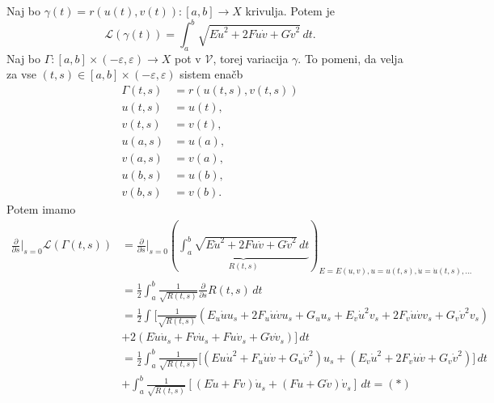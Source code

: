 Naj bo $\gamma(t) = r(u(t), v(t)): [a,b] \to X$ krivulja. Potem je \begin{equation*}
\mathcal{L}(\gamma(t)) = \int_{a}^{b} \sqrt{E\dot{u}^2 + 2F\dot{u}\dot{v} + G\dot{v}^2}  \, dt. 
\end{equation*}  
Naj bo $\Gamma : [a,b] \times  (-\varepsilon, \varepsilon) \to  X$ pot v $\mathcal{V}$, torej variacija $\gamma$. To pomeni, da velja za vse $(t,s) \in [a,b] \times  (-\varepsilon, \varepsilon)$ sistem enačb
\begin{align*}
    \Gamma(t,s) &= r(u(t,s), v(t,s)) \\
     u(t,s) &= u(t), \\
     v(t,s) &= v(t), \\
     u(a,s) &= u(a), \\
     v(a,s) &= v(a), \\
     u(b,s) &= u(b), \\
     v(b,s) &= v(b). 
\end{align*}
Potem imamo \begin{align*}
    \frac{ \partial  }{ \partial s} \bigg|_{s = 0} \mathcal{L}(\Gamma(t,s))  &= \frac{ \partial  }{ \partial s } \bigg|_{s = 0}  \left(\underbrace{\int_{a}^{b} \sqrt{E\dot{u}^2 + 2F\dot{u}\dot{v} + G\dot{v}^2}  \, dt }_{R(t,s)}\right)_{E = E(u,v), u = u(t,s), \dot{u} = \dot{u}(t,s), \ldots} \\
    &=  \frac{1}{2} \int_{a}^{b} \frac{1}{\sqrt{R(t,s)}} \frac{ \partial  }{ \partial s } R(t,s)  \, dt \\
    &=  \frac{1}{2} \int_{} \bigg[\frac{1}{\sqrt{R(t,s)}} (E_u \dot{u} u_s + 2F_u \dot{u} \dot{v} u_s + G_u u_s + E_v \dot{u}^2 v_s + 2F_v \dot{u} \dot{v} v_s + G_v \dot{v}^2 v_s) \\
    &+  2(E \dot{u} \dot{u}_s + F \dot{v} \dot{u}_s + F\dot{u} \dot{v}_s + G \dot{v} \dot{v}_s) \bigg] \, dt \\
    &= \frac{1}{2} \int_{a}^{b}  \frac{1}{\sqrt{R(t,s)}} \bigg[ (Eu \dot{u}^2 + F_u \dot{u} \dot{v} + G_u \dot{v}^2) u_s + (E_v \dot{u}^2 + 2F_v \dot{u} \dot{v} + G_v \dot{v}^2) \bigg] \, dt \\
    &+ \int_{a}^{b} \frac{1}{\sqrt{R(t,s)}} [(E\dot{u} + F\dot{v})\dot{u}_s + (F\dot{u} + G\dot{v}) \dot{v}_s] \, dt = (*)
\end{align*}  

